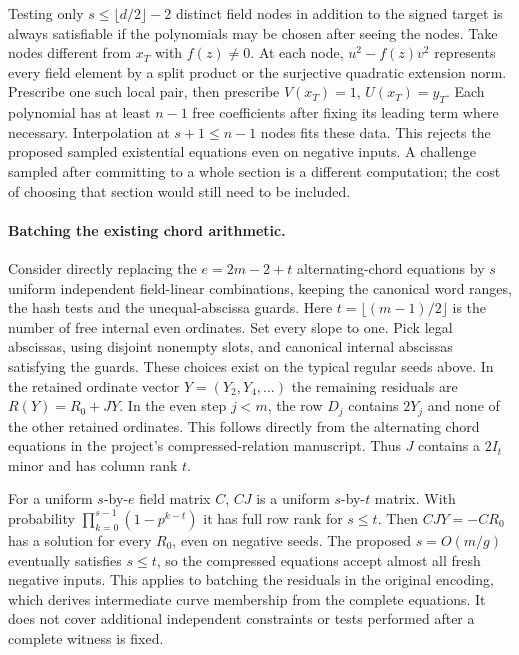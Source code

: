 \documentclass[11pt]{article}
\begin{document}
Testing only $s\le\lfloor d/2\rfloor-2$ distinct field nodes in addition
to the signed target is always satisfiable if the polynomials may be
chosen after seeing the nodes. Take nodes different from $x_T$ with
$f(z)\ne0$. At each node, $u^2-f(z)v^2$ represents every field element
by a split product or the surjective quadratic extension norm. Prescribe
one such local pair, then prescribe $V(x_T)=1$, $U(x_T)=y_T$.
Each polynomial has at least $n-1$ free coefficients after fixing its
leading term where necessary. Interpolation at $s+1\le n-1$ nodes fits
these data. This rejects the proposed sampled existential equations even
on negative inputs. A challenge sampled after committing to a whole
section is a different computation; the cost of choosing that section
would still need to be included.

\paragraph{Batching the existing chord arithmetic.}
Consider directly replacing the $e=2m-2+t$ alternating-chord equations
by $s$ uniform independent field-linear combinations, keeping the
canonical word ranges, the hash tests and the unequal-abscissa guards.
Here $t=\lfloor(m-1)/2\rfloor$ is the number of free internal even
ordinates. Set every slope to one. Pick legal abscissas, using disjoint
nonempty slots, and canonical internal abscissas satisfying the guards.
These choices exist on the typical regular seeds above. In the retained
ordinate vector $Y=(Y_2,Y_4,\ldots)$ the remaining residuals are
$R(Y)=R_0+JY$. In the even step $j<m$, the row $D_j$ contains $2Y_j$
and none of the other retained ordinates. This follows directly from the
alternating chord equations in the project's compressed-relation manuscript.
Thus $J$ contains a $2I_t$ minor and has column rank $t$.

For a uniform $s$-by-$e$ field matrix $C$, $CJ$ is a uniform
$s$-by-$t$ matrix. With probability $\prod_{k=0}^{s-1}(1-p^{k-t})$ it
has full row rank for $s\le t$. Then $CJY=-CR_0$ has a solution for
every $R_0$, even on negative seeds. The proposed $s=O(m/g)$ eventually
satisfies $s\le t$, so the compressed equations accept almost all fresh
negative inputs. This applies to batching the residuals in the original
encoding, which derives intermediate curve membership from the complete
equations. It does not cover additional independent constraints or
tests performed after a complete witness is fixed.
\end{document}
